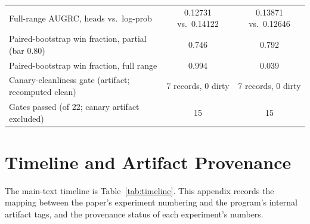 \documentclass[10pt,a4paper]{article}
\newcommand{\fail}[1]{\textcolor{failred}{#1}}
\begin{document}
\begin{table}[htbp]
\begin{tabularx}{\textwidth}{@{}Xcc@{}}
Full-range AUGRC, heads vs.\ log-prob & 0.12731 vs.\ 0.14122 & 0.13871 vs.\ 0.12646 \\
Paired-bootstrap win fraction, partial (bar 0.80) & \fail{0.746} & \fail{0.792} \\
Paired-bootstrap win fraction, full range & 0.994 & 0.039 \\
Canary-cleanliness gate (artifact; recomputed clean) & 7 records, 0 dirty & 7 records, 0 dirty \\
Gates passed (of 22; canary artifact excluded) & 15 & 15 \\
\bottomrule
\end{tabularx}
\end{table}

\clearpage

\section{Timeline and Artifact Provenance}\label{app:timeline}

The main-text timeline is Table~\ref{tab:timeline}. This appendix records the
mapping between the paper's experiment numbering and the program's internal
artifact tags, and the provenance status of each experiment's numbers.
\end{document}
